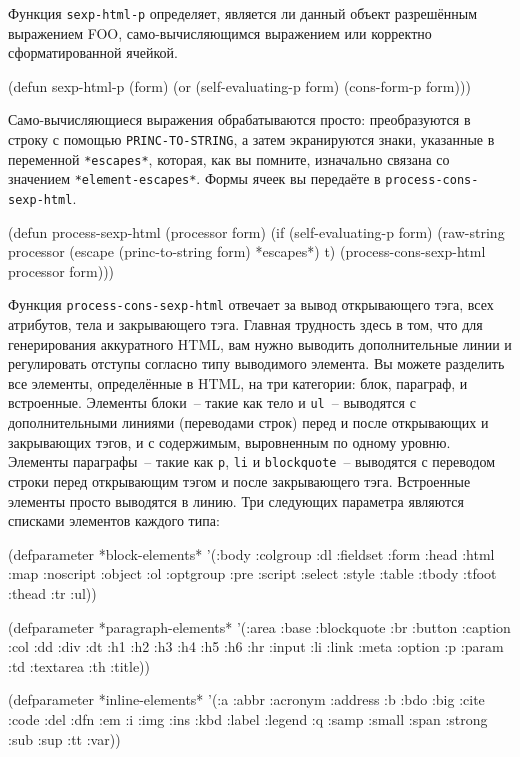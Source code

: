 Функция \lstinline{sexp-html-p} определяет, является ли данный объект разрешённым выражением
FOO, само-вычисляющимся выражением или корректно сформатированной ячейкой.

\begin{myverb}
(defun sexp-html-p (form)
  (or (self-evaluating-p form) (cons-form-p form)))
\end{myverb}

Само-вычисляющиеся выражения обрабатываются просто: преобразуются в строку с помощью
\lstinline{PRINC-TO-STRING}, а затем экранируются знаки, указанные в переменной
\lstinline{*escapes*}, которая, как вы помните, изначально связана со значением
\lstinline{*element-escapes*}. Формы ячеек вы передаёте в \lstinline{process-cons-sexp-html}.

\begin{myverb}
(defun process-sexp-html (processor form)
  (if (self-evaluating-p form)
    (raw-string processor (escape (princ-to-string form) *escapes*) t)
    (process-cons-sexp-html processor form)))
\end{myverb}

Функция \lstinline{process-cons-sexp-html} отвечает за вывод открывающего тэга, всех атрибутов,
тела и закрывающего тэга. Главная трудность здесь в том, что для генерирования аккуратного
HTML, вам нужно выводить дополнительные линии и регулировать отступы согласно типу
выводимого элемента. Вы можете разделить все элементы, определённые в HTML, на три
категории: блок, параграф, и встроенные. Элементы блоки~-- такие как тело и \lstinline{ul}~--
выводятся с дополнительными линиями (переводами строк) перед и после открывающих и
закрывающих тэгов, и с содержимым, выровненным по одному уровню. Элементы параграфы~--
такие как \lstinline{p}, \lstinline{li} и \lstinline{blockquote}~-- выводятся с переводом строки перед
открывающим тэгом и после закрывающего тэга. Встроенные элементы просто выводятся в
линию. Три следующих параметра являются списками элементов каждого типа:

\begin{myverb}
(defparameter *block-elements*
  '(:body :colgroup :dl :fieldset :form :head :html :map :noscript :object
    :ol :optgroup :pre :script :select :style :table :tbody :tfoot :thead
    :tr :ul))

(defparameter *paragraph-elements*
  '(:area :base :blockquote :br :button :caption :col :dd :div :dt :h1
    :h2 :h3 :h4 :h5 :h6 :hr :input :li :link :meta :option :p :param
    :td :textarea :th :title))

(defparameter *inline-elements*
  '(:a :abbr :acronym :address :b :bdo :big :cite :code :del :dfn :em
    :i :img :ins :kbd :label :legend :q :samp :small :span :strong :sub
    :sup :tt :var))
\end{myverb}

